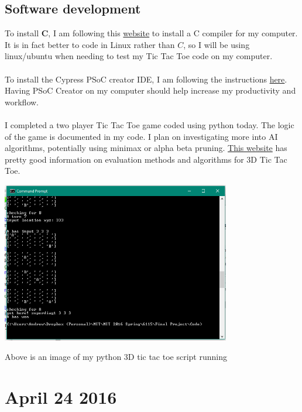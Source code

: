 \documentclass[12pt,twoside]{article}
\begin{document}
\subsection{Software development}
To install {\bf C}, I am following this \href{https://en.wikibooks.org/wiki/C_Programming/What_you_need_before_you_can_learn}{website} to install a C compiler for my computer. It is in fact better to code in Linux rather than $C$, so I will be using linux/ubuntu when needing to test my Tic Tac Toe code on my computer.
\\
\\ To install the Cypress PSoC creator IDE, I am following the instructions \href{http://www.cypress.com/products/psoc-software}{here}. Having PSoC Creator on my computer should help increase my productivity and workflow. 
\\
\\ I completed a two player Tic Tac Toe game coded using python today. The logic of the game is documented in my code. I plan on investigating more into AI algorithms, potentially using minimax or alpha beta pruning. \href{http://www.half-real.net/tictactoe/}{This website} has pretty good information on evaluation methods and algorithms for 3D Tic Tac Toe. 
\begin{center}\includegraphics[width = 100mm]{Pics/4-21python.png} \end{center}
Above is an image of my python 3D tic tac toe script running


\section{April 24 2016}
\end{document}
